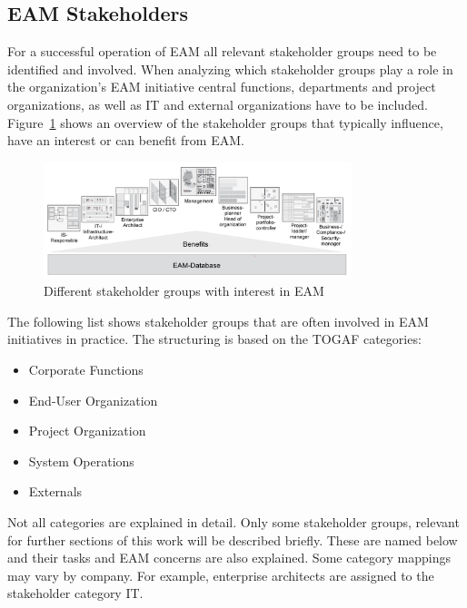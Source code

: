 \subsection{EAM Stakeholders}
For a successful operation of EAM all relevant stakeholder groups need to be identified and involved.
When analyzing which stakeholder groups play a role in the organization's EAM initiative central functions, departments and project organizations, as well as IT and external organizations have to be included. 
Figure~\ref{fig:Differet stakeholder groups with interenst in EAM} shows an overview of the stakeholder groups that typically influence, have an interest or can benefit from EAM. \cite{Hanschke2011}
\begin{figure}[htpb]
  \centering
  \includegraphics[width=0.8\textwidth]{figures/eam-stakeholder.png}
  \caption{ Different stakeholder groups with interest in EAM \cite{Hanschke2011}}
  \label{fig:Differet stakeholder groups with interenst in EAM}
\end{figure}

The following list shows stakeholder groups that are often involved in EAM initiatives in practice. The structuring is based on the TOGAF categories: \cite{TheOpenGroup2011}
\begin{itemize}
    \item Corporate Functions
    \item End-User Organization
    \item Project Organization
    \item System Operations
    \item Externals
\end{itemize}

Not all categories are explained in detail. Only some stakeholder groups, relevant for further sections of this work will be described briefly. These are named below and their tasks and EAM concerns are also explained. Some category mappings may vary by company. For example, enterprise architects are assigned to the stakeholder category IT. \cite{Hanschke2011}\cite{TheOpenGroup2011}

